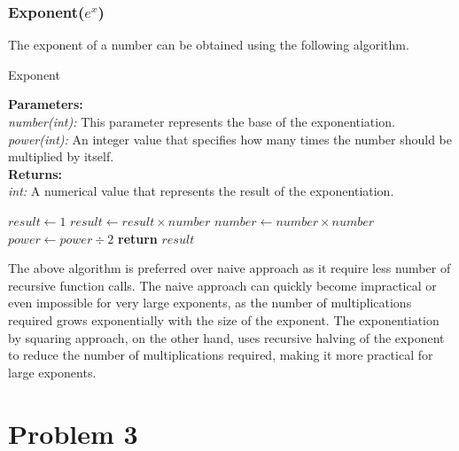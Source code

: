 \documentclass{report}
\begin{document}
\subsection{Exponent($e^x$)}
  \begin{flushleft}
    The exponent of a number can be obtained using the following algorithm.
  \end{flushleft}

  \begin{algorithm}
    \caption{Exponent}\label{exp}
      \begin{tabbing}
        \textbf{Parameters:}\\
          \hspace{1em}\textit{number(int):} This parameter represents the base of the exponentiation.\\
          \hspace{1em}\textit{power(int):} An integer value that specifies how many times the number should be multiplied by itself.\\
          
        \textbf{Returns:}\\
          \hspace{1em}\textit{int:}  A numerical value that represents the result of the exponentiation.
      \end{tabbing}
      \vspace{1 em}
    \begin{algorithmic}
          \State $result \gets 1$
                  \State $result \gets result \times number$
              \EndIf
              \State $number \gets number \times number$
              \State $power \gets power \div 2$ 
          \EndWhile
          \State \textbf{return} $result$
      \EndFunction
      \end{algorithmic}
  \end{algorithm}
  \begin{flushleft}
    The above algorithm is preferred over naive approach as it require less number of recursive function calls.
    The naive approach can quickly become impractical or even impossible for very large exponents, as the number of multiplications required grows exponentially with the size of the exponent. The exponentiation by squaring approach, on the other hand, uses recursive halving of the exponent to reduce the number of multiplications required, making it more practical for large exponents.
  \end{flushleft}
\pagebreak

\chapter{Problem 3}



\printindex
\end{document}
